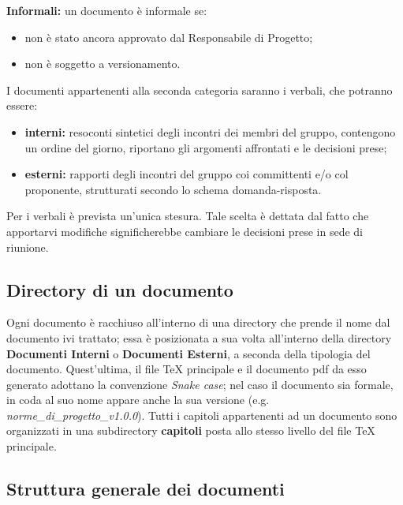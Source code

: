  \textbf{Informali:} un documento è informale se:
\begin{itemize}
\item non è stato ancora approvato dal Responsabile di Progetto;
	\item non è soggetto a versionamento.
\end{itemize}
I documenti appartenenti alla seconda categoria saranno i verbali, che potranno
essere:
\begin{itemize}
\item \textbf{interni:} resoconti sintetici degli incontri dei membri del gruppo, contengono un ordine del giorno, riportano gli argomenti affrontati e le decisioni prese;
	\item \textbf{esterni:} rapporti degli incontri del gruppo coi committenti e/o col proponente, strutturati secondo lo schema domanda-risposta.
\end{itemize}
Per i verbali è prevista un’unica stesura. Tale scelta è dettata dal fatto che apportarvi modifiche significherebbe cambiare le decisioni prese in sede di riunione.
\subsection{Directory di un documento}
Ogni documento è racchiuso all'interno di una directory che prende il nome dal documento ivi trattato; essa è posizionata a sua volta all'interno della directory \textbf{Documenti Interni} o \textbf{Documenti Esterni}, a seconda della tipologia del documento. Quest'ultima, il file \TeX{} principale e il documento pdf da esso generato adottano la convenzione \textit{Snake case}; nel caso il documento sia formale, in coda al suo nome appare anche la sua versione (e.g. \textit{norme\_di\_progetto\_v1.0.0}).
Tutti i capitoli appartenenti ad un documento sono organizzati in una subdirectory \textbf{capitoli} posta allo stesso livello del file \TeX{} principale.
\subsection{Struttura generale dei documenti}

